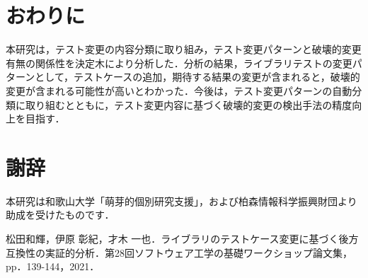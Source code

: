 \documentclass[uplatex,dvipdfmx,a4paper,twocolumn,base=11pt,jbase=11pt,ja=standard]{bxjsarticle}  %
\begin{document}




\section{おわりに}

本研究は，テスト変更の内容分類に取り組み，テスト変更パターンと破壊的変更有無の関係性を決定木により分析した．分析の結果，ライブラリテストの変更パターンとして，テストケースの追加，期待する結果の変更が含まれると，破壊的変更が含まれる可能性が高いとわかった．今後は，テスト変更パターンの自動分類に取り組むとともに，テスト変更内容に基づく破壊的変更の検出手法の精度向上を目指す．

\section*{謝辞}

本研究は和歌山大学「萌芽的個別研究支援」，および柏森情報科学振興財団より助成を受けたものです．

\begin{thebibliography}{10}
   松田和輝，伊原 彰紀，才木 一也．ライブラリのテストケース変更に基づく後方互換性の実証的分析．第28回ソフトウェア工学の基礎ワークショップ論文集，pp．139-144，2021．
\end{thebibliography}
\end{document}
